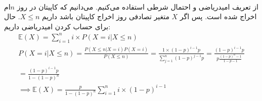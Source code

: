 \\
از تعریف امیدریاضی و احتمال شرطی استفاده می‌کنیم.
می‌دانیم که کاپیتان در روز
$n$ام
اخراج شده است. پس اگر
$X$
متغیر تصادفی روز اخراج کاپیتان باشد داریم
$X \le n$.
حال برای حساب کردن امیدریاضی داریم:
\begin{gather*}
    \mathbb{E}(X) = \sum_{i=1}^{n} i \times P(X = i | X \le n)\\
    P(X = i | X \le n) = \frac{P(X \le n | X = i)P(X = i)}{P(X \le n)} = \frac{1 \times (1-p)^{i-1}p}{\sum_{j=1}^{n} (1-p)^{j-1}p}
    = \frac{(1-p)^{i-1}p}{p \frac{(1-p)^{n}-1}{1-p-1}}
    \\= \frac{(1-p)^{i-1}p}{1-(1-p)^{n}}\\
    \implies \mathbb{E}(X) = \frac{p}{1-(1-p)^{n}} \sum_{i=1}^{n}  i \times (1-p)^{i-1}
\end{gather*}
